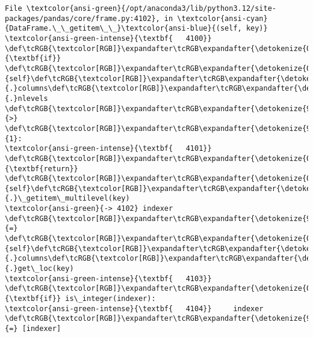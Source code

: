 \documentclass[11pt]{article}
\begin{document}
\begin{Verbatim}[commandchars=\\\{\}, frame=single, framerule=2mm, rulecolor=\color{outerrorbackground}]
File \textcolor{ansi-green}{/opt/anaconda3/lib/python3.12/site-packages/pandas/core/frame.py:4102}, in \textcolor{ansi-cyan}{DataFrame.\_\_getitem\_\_}\textcolor{ansi-blue}{(self, key)}
\textcolor{ansi-green-intense}{\textbf{   4100}} \def\tcRGB{\textcolor[RGB]}\expandafter\tcRGB\expandafter{\detokenize{0,135,0}}{\textbf{if}} \def\tcRGB{\textcolor[RGB]}\expandafter\tcRGB\expandafter{\detokenize{0,135,0}}{self}\def\tcRGB{\textcolor[RGB]}\expandafter\tcRGB\expandafter{\detokenize{98,98,98}}{.}columns\def\tcRGB{\textcolor[RGB]}\expandafter\tcRGB\expandafter{\detokenize{98,98,98}}{.}nlevels \def\tcRGB{\textcolor[RGB]}\expandafter\tcRGB\expandafter{\detokenize{98,98,98}}{>} \def\tcRGB{\textcolor[RGB]}\expandafter\tcRGB\expandafter{\detokenize{98,98,98}}{1}:
\textcolor{ansi-green-intense}{\textbf{   4101}}     \def\tcRGB{\textcolor[RGB]}\expandafter\tcRGB\expandafter{\detokenize{0,135,0}}{\textbf{return}} \def\tcRGB{\textcolor[RGB]}\expandafter\tcRGB\expandafter{\detokenize{0,135,0}}{self}\def\tcRGB{\textcolor[RGB]}\expandafter\tcRGB\expandafter{\detokenize{98,98,98}}{.}\_getitem\_multilevel(key)
\textcolor{ansi-green}{-> 4102} indexer \def\tcRGB{\textcolor[RGB]}\expandafter\tcRGB\expandafter{\detokenize{98,98,98}}{=} \def\tcRGB{\textcolor[RGB]}\expandafter\tcRGB\expandafter{\detokenize{0,135,0}}{self}\def\tcRGB{\textcolor[RGB]}\expandafter\tcRGB\expandafter{\detokenize{98,98,98}}{.}columns\def\tcRGB{\textcolor[RGB]}\expandafter\tcRGB\expandafter{\detokenize{98,98,98}}{.}get\_loc(key)
\textcolor{ansi-green-intense}{\textbf{   4103}} \def\tcRGB{\textcolor[RGB]}\expandafter\tcRGB\expandafter{\detokenize{0,135,0}}{\textbf{if}} is\_integer(indexer):
\textcolor{ansi-green-intense}{\textbf{   4104}}     indexer \def\tcRGB{\textcolor[RGB]}\expandafter\tcRGB\expandafter{\detokenize{98,98,98}}{=} [indexer]


\end{Verbatim}
\end{document}
